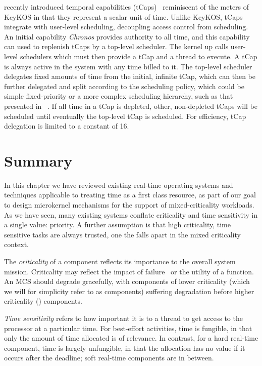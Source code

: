 \composite recently introduced temporal capabilities
(tCaps)~\citep{Gadepalli_GBKP_17} reminiscent of
the meters of KeyKOS in that they represent a scalar unit of time.
Unlike KeyKOS, tCaps integrate with user-level scheduling, decoupling access control
from scheduling. An initial capability \emph{Chronos} provides authority to all time, and this capability
can used to replenish tCaps by a top-level scheduler. The kernel up calls user-level schedulers 
which must then provide a tCap and a thread to execute. A tCap is always active in the system with
any time billed to it. The top-level scheduler delegates fixed amounts of time from the initial,
infinite tCap, which can then be further delegated and split according to the scheduling policy,
which could be simple fixed-priority or a more complex scheduling hierarchy, such as that presented
in \hires~\citep{Parmer_West_11}. If all time
in a tCap is depleted, other, non-depleted tCaps will be scheduled until eventually the top-level
tCap is scheduled. For efficiency, tCap delegation is limited to a constant of 16. 

\section{Summary}

In this chapter we have reviewed existing real-time operating systems and techniques applicable to
treating time as a first class resource, as part of our goal to design microkernel mechanisms for 
the support of mixed-criticality workloads. 
As we have seen, many existing systems conflate criticality and time sensitivity 
in a single value: priority. A further assumption is that high criticality, time sensitive tasks are
always trusted, one the falls apart in the mixed criticality context.

The \emph{criticality} of a component reflects its importance to the
overall system mission.
Criticality may reflect the impact of failure~\citep{ARINC653} or the
utility of a function. An MCS should degrade gracefully, with
components of lower criticality (which we will for simplicity refer to
as  components) suffering degradation before higher
criticality () components.

\emph{Time sensitivity} refers to how important it is to a thread to
get access to the processor at a particular time. For best-effort activities, time is
fungible, in that only the amount of time allocated is of
relevance. In contrast, for a hard real-time component, time is
largely unfungible, in that the allocation has no value if it occurs after
the deadline; soft real-time components are in between.

